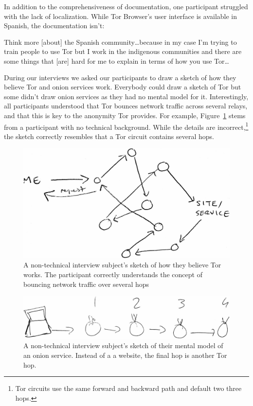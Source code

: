 In addition to the comprehensiveness of documentation, one participant struggled
with the lack of localization.  While Tor Browser's user interface is available
in Spanish, the documentation isn't:

\begin{displayquote}
Think more [about] the Spanish community\dots because in my case I'm trying to
train people to use Tor but I work in the indigenous communities and there are
some things that [are] hard for me to explain in terms of how you use Tor\dots
\end{displayquote}

During our interviews we asked our participants to draw a sketch of how they
believe Tor and onion services work.  Everybody could draw a sketch of Tor but
some didn't draw onion services as they had no mental model for it.
Interestingly, all participants understood that Tor bounces network traffic
across several relays, and that this is key to the anonymity Tor provides.  For
example, Figure~\ref{fig:tor-sketch} stems from a participant with no technical
background.  While the details are incorrect,\footnote{Tor circuits use the same
forward and backward path and default two three hops.} the sketch correctly
resembles that a Tor circuit contains several hops.

\begin{figure}[t]
    \centering
    \includegraphics[width=0.8\linewidth]{figures/p08-tor-sketch.jpg}
    \caption{A non-technical interview subject's sketch of how they believe Tor
    works.  The participant correctly understands the concept of bouncing
    network traffic over several hops}
    \label{fig:tor-sketch}
\end{figure}

\begin{figure}[t]
    \centering
    \includegraphics[width=0.8\linewidth]{figures/p01-os-sketch.jpg}
    \caption{A non-technical interview subject's sketch of their mental model
    of an onion service.  Instead of a a website, the final hop is another Tor
    hop.}
    \label{fig:os-sketch}
\end{figure}

